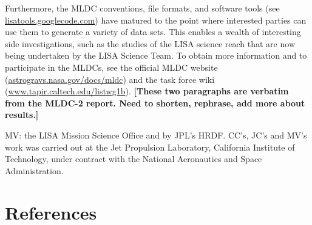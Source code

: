 \documentclass{iopart}
\begin{document}
Furthermore, the MLDC conventions, file formats, and software tools (see \url{lisatools.googlecode.com}) have matured to the point where interested parties can use them to generate a variety of data sets. This enables a wealth of interesting side investigations, such as the studies of the LISA science reach that are now being undertaken by the LISA Science Team. To obtain more information and to participate in the MLDCs, see the official MLDC website (\url{astrogravs.nasa.gov/docs/mldc}) and the task force wiki (\url{www.tapir.caltech.edu/listwg1b}).
\textbf{[These two paragraphs are verbatim from the MLDC-2 report. Need to shorten, rephrase, add more about results.]}

\ack

MV: the LISA Mission Science Office and by JPL's HRDF.
CC's, JC's and MV's work was carried out at the Jet Propulsion Laboratory, California Institute of Technology, under contract with the National Aeronautics and Space Administration.



\section*{References}
\end{document}
